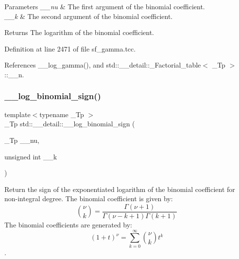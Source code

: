 \begin{DoxyParams}{Parameters}
{\em \+\_\+\+\_\+nu} & The first argument of the binomial coefficient. \\
\hline
{\em \+\_\+\+\_\+k} & The second argument of the binomial coefficient. \\
\hline
\end{DoxyParams}
\begin{DoxyReturn}{Returns}
The logarithm of the binomial coefficient. 
\end{DoxyReturn}


Definition at line 2471 of file sf\+\_\+gamma.\+tcc.



References \+\_\+\+\_\+log\+\_\+gamma(), and std\+::\+\_\+\+\_\+detail\+::\+\_\+\+Factorial\+\_\+table$<$ \+\_\+\+Tp $>$\+::\+\_\+\+\_\+n.

\mbox{\label{namespacestd_1_1____detail_aa89a8a5ced6325e1d64782f84e4ad95d}} 
\subsubsection{\texorpdfstring{\+\_\+\+\_\+log\+\_\+binomial\+\_\+sign()}{\_\_log\_binomial\_sign()}\hspace{0.1cm}{\footnotesize\ttfamily [1/2]}}
{\footnotesize\ttfamily template$<$typename \+\_\+\+Tp $>$ \\
\+\_\+\+Tp std\+::\+\_\+\+\_\+detail\+::\+\_\+\+\_\+log\+\_\+binomial\+\_\+sign (\begin{DoxyParamCaption}\item[{\+\_\+\+Tp}]{\+\_\+\+\_\+nu,  }\item[{unsigned int}]{\+\_\+\+\_\+k }\end{DoxyParamCaption})}



Return the sign of the exponentiated logarithm of the binomial coefficient for non-\/integral degree. The binomial coefficient is given by\+: \[ \binom{\nu}{k} = \frac{\Gamma(\nu+1)}{\Gamma(\nu-k+1) \Gamma(k+1)} \] The binomial coefficients are generated by\+: \[ \left(1 + t\right)^\nu = \sum_{k=0}^\infty \binom{\nu}{k} t^k \]. 


